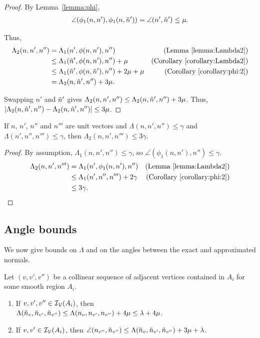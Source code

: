 \begin{proof}

By Lemma~\ref{lemma:phi},
\begin{align*}
\angle(\phi_1(n,n'),\phi_1(n,\tilde{n}')) = \angle(n',\tilde{n}') \le \mu.
\end{align*}

Thus,
\begin{align*}
\Lambda_2(n,n',n'') & = \Lambda_1(n', \phi(n,n'), n'') 
  & \mbox{(Lemma~\ref{lemma:Lambda2})} \\
& \le \Lambda_1(\tilde{n}', \phi(n,n'), n'') + \mu
  & \mbox{(Corollary~\ref{corollary:Lambda2})} \\
& \le \Lambda_1(\tilde{n}', \phi(n,\tilde{n}'), n'') + 2\mu + \mu
  & \mbox{(Corollary~\ref{corollary:phi:2})} \\
& = \Lambda_2(n,\tilde{n}',n'') + 3 \mu.
\end{align*}

Swapping $n'$ and $\tilde{n}'$ gives
$\Lambda_2(n,n',n'') \le \Lambda_2(n, \tilde{n}',n'') + 3 \mu$.
Thus,
$|\Lambda_2(n,\tilde{n}',n'') - \Lambda_2(n, \tilde{n}',n'')| \le 3 \mu$.

\end{proof}

\begin{corollary}
If $n$, $n'$, $n''$ and $n'''$ are unit vectors
and $\Lambda(n,n',n'') \le \gamma$
and $\Lambda(n',n'',n''') \le \gamma$,
then $\Lambda_2(n,n',n''') \le 3\gamma$.
\label{corollary:Lambda2:3}
\end{corollary}

\begin{proof}
By assumption, $\Lambda_1(n,n',n'') \le \gamma$,
so $\angle(\phi_1(n,n'),n'') \le \gamma$.
\begin{align*}
\Lambda_2(n,n',n''') & = \Lambda_1(n', \phi_1(n,n'), n'')
 & \mbox{(Lemma~\ref{lemma:Lambda2})} \\
 & \le \Lambda_1(n', n'', n''') + 2 \gamma 
 & \mbox{(Corollary~\ref{corollary:phi:2})} \\
 & \le 3\gamma.
\end{align*}
\end{proof}


\subsection{Angle bounds}

We now give bounds on $\Lambda$ and on the angles
between the exact and approximated normals.

\begin{propAngle}
Let $(v, v', v'')$ be a collinear sequence of adjacent vertices
contained in $A_i$ for some smooth region $A_i$.
\begin{enumerate}
\item If $v, v', v'' \in \mathcal{I_V}(A_i)$, then\\
{\centering
$\Lambda(\tilde{n}_v, \tilde{n}_{v'}, \tilde{n}_{v''}) \le 
\Lambda(n_v, n_{v'}, n_{v''}) + 4 \mu \le \lambda + 4 \mu$.}
\item If $v, v' \in \mathcal{I_V}(A_i)$, then
$\angle(n_{v''},\tilde{n}_{v''}) \le 
   \Lambda(\tilde{n}_v,\tilde{n}_{v'},\tilde{n}_{v''}) + 3 \mu + \lambda$.
\end{enumerate}
\end{propAngle}

